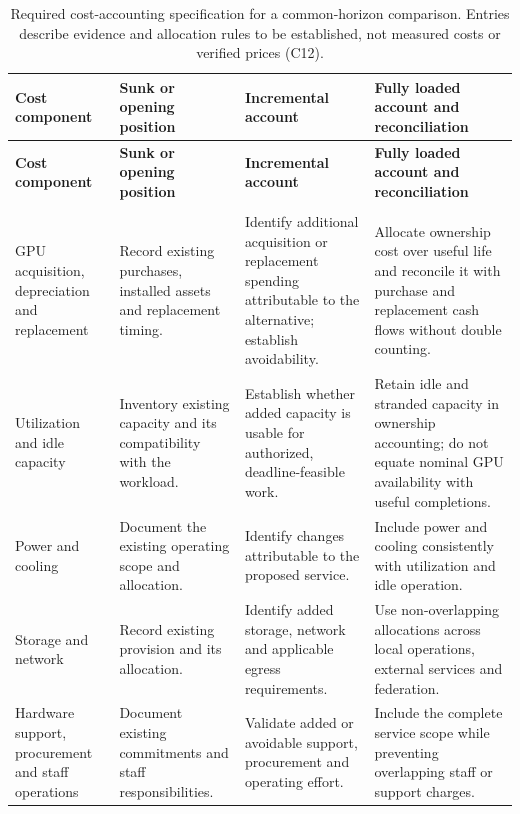\documentclass[11pt]{article}
\begin{document}
\begin{landscape}
\small
\begin{longtable}{@{}>{\raggedright\arraybackslash}p{}>{\raggedright\arraybackslash}p{}>{\raggedright\arraybackslash}p{}>{\raggedright\arraybackslash}p{}@{}}
\caption{Required cost-accounting specification for a common-horizon comparison. Entries describe evidence and allocation rules to be established, not measured costs or verified prices (C12).}\\
\toprule
\textbf{Cost component} & \textbf{Sunk or opening position} & \textbf{Incremental account} & \textbf{Fully loaded account and reconciliation}\\
\midrule
\endfirsthead
\toprule
\textbf{Cost component} & \textbf{Sunk or opening position} & \textbf{Incremental account} & \textbf{Fully loaded account and reconciliation}\\
\midrule
\endhead
\midrule
\multicolumn{4}{r}{\footnotesize Continued on next page}\\
\endfoot
\bottomrule
\endlastfoot
GPU acquisition, depreciation and replacement & Record existing purchases, installed assets and replacement timing. & Identify additional acquisition or replacement spending attributable to the alternative; establish avoidability. & Allocate ownership cost over useful life and reconcile it with purchase and replacement cash flows without double counting.\\
Utilization and idle capacity & Inventory existing capacity and its compatibility with the workload. & Establish whether added capacity is usable for authorized, deadline-feasible work. & Retain idle and stranded capacity in ownership accounting; do not equate nominal GPU availability with useful completions.\\
Power and cooling & Document the existing operating scope and allocation. & Identify changes attributable to the proposed service. & Include power and cooling consistently with utilization and idle operation.\\
Storage and network & Record existing provision and its allocation. & Identify added storage, network and applicable egress requirements. & Use non-overlapping allocations across local operations, external services and federation.\\
Hardware support, procurement and staff operations & Document existing commitments and staff responsibilities. & Validate added or avoidable support, procurement and operating effort. & Include the complete service scope while preventing overlapping staff or support charges.\\

\end{longtable}
\end{landscape}
\end{document}
